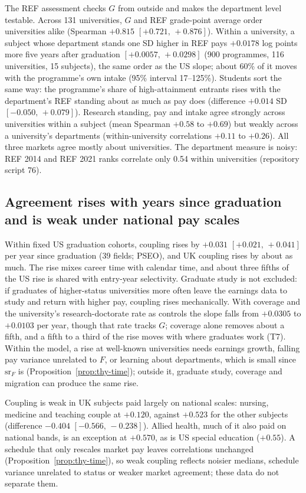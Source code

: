 \documentclass[11pt]{article}
\newcommand{\ci}[2]{$[#1,\allowbreak\,#2]$}
\begin{document}
The REF assessment checks $G$ from outside and makes the department level testable. Across 131 universities, $G$ and
REF grade-point average order universities alike (Spearman $+0.815$ \ci{+0.721}{+0.876}). Within a university, a
subject whose department stands one SD higher in REF pays $+0.0178$ log points more five years after graduation
\ci{+0.0057}{+0.0298} (900 programmes, 116 universities, 15 subjects), the same order as the US slope; about 60\% of
it moves with the programme's own intake (95\% interval 17--125\%). Students sort the same way: the programme's
share of high-attainment entrants rises with the department's REF standing about as much as pay does (difference
$+0.014$ SD \ci{-0.050}{+0.079}). Research standing, pay and intake agree strongly across universities within a
subject (mean Spearman $+0.58$ to $+0.69$) but weakly across a university's departments (within-university
correlations $+0.11$ to $+0.26$). All three markets agree mostly about universities. The department measure is noisy:
REF 2014 and REF 2021 ranks correlate only 0.54 within universities (repository script 76).

\subsection{Agreement rises with years since graduation and is weak under national pay scales}\label{sec:res-time}

Within fixed US graduation cohorts, coupling rises by $+0.031$ \ci{+0.021}{+0.041} per year since graduation (39
fields; PSEO), and UK coupling rises by about as much. The rise mixes career time with calendar time, and about three
fifths of the US rise is shared with entry-year selectivity. Graduate study is not excluded: if graduates of
higher-status universities more often leave the earnings data to study and return with higher pay, coupling rises
mechanically. With coverage and the university's research-doctorate rate as controls the slope falls from $+0.0305$
to $+0.0103$ per year, though that rate tracks $G$; coverage alone removes about a fifth, and a fifth to a third of
the rise moves with where graduates work (T7). Within the model, a rise at well-known universities needs earnings
growth, falling pay variance unrelated to $F$, or learning about departments, which is small since $\mathrm{sr}_F$ is
(Proposition~\ref{prop:thy-time}); outside it, graduate study, coverage and migration can produce the same rise.

Coupling is weak in UK subjects paid largely on national scales: nursing, medicine and teaching couple at $+0.120$,
against $+0.523$ for the other subjects (difference $-0.404$ \ci{-0.566}{-0.238}). Allied health, much of it also
paid on national bands, is an exception at $+0.570$, as is US special education ($+0.55$). A schedule that only
rescales market pay leaves correlations unchanged (Proposition~\ref{prop:thy-time}), so weak coupling reflects
noisier medians, schedule variance unrelated to status or weaker market agreement; these data do not separate them.
\end{document}
